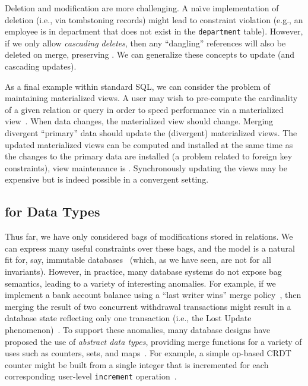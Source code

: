 Deletion and modification are more challenging. A na\"{\i}ve
implementation of deletion (i.e., via tombstoning records) might lead
to constraint violation (e.g., an employee is in department that does
not exist in the \texttt{department} table). However, if we only allow
\textit{cascading deletes}, then any ``dangling'' references will also
be deleted on merge, preserving \iconfluence. We can generalize these
concepts to update (and cascading updates).

 As a final example within standard SQL,
we can consider the problem of maintaining materialized views. A user
may wish to pre-compute the cardinality of a given relation or query
in order to speed performance via a materialized
view~\cite{gray-book}. When data changes, the materialized view should
change. Merging divergent ``primary'' data should update the
(divergent) materialized views. The updated materialized views can be
computed and installed at the same time as the changes to the primary
data are installed (a problem related to foreign key constraints),
view maintenance is \iconfluent. Synchronously updating the views may
be expensive but is indeed possible in a convergent setting.

\subsection{\iconfluence for Data Types}

Thus far, we have only considered bags of modifications stored in
relations. We can express many useful constraints over these bags, and
the model is a natural fit for, say, immutable
databases~\cite{gray-virtues,gray-book} (which, as we have seen, are
not \iconfluent for all invariants). However, in practice, many
database systems do not expose bag semantics, leading to a variety of
interesting anomalies. For example, if we implement a bank account
balance using a ``last writer wins'' merge policy~\cite{vogels-defs},
then merging the result of two concurrent withdrawal transactions
might result in a database state reflecting only one transaction
(i.e., the Lost Update phenomenon)~\cite{adya-isolation,hat-vldb}. To
support these anomalies, many database designs have proposed the use
of \textit{abstract data types}, providing merge functions for a
variety of uses such as counters, sets, and
maps~\cite{crdt,atomictransactions,weihl-thesis,blooml}. For example,
a simple op-based CRDT counter might be built from a single integer
that is incremented for each corresponding user-level
\texttt{increment} operation~\cite{crdt}.

